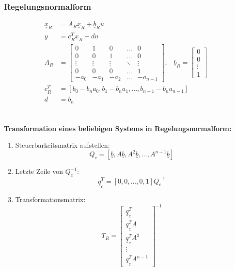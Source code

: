 \documentclass[a4paper,twocolumn,10pt]{article}
\begin{document}
\subsubsection{Regelungsnormalform}
\begin{equation*}
\begin{split}
\underline{\dot{x}}_R&=A_R\underline{x}_R+\underline{b}_Ru\\
y&=\underline{c}_R^T\underline{x}_R+du\\
A_R&=\begin{bmatrix}0 & 1 & 0 & ... & 0 \\ 0 & 0 & 1 & ... & 0 \\
\vdots & \vdots & \vdots & \ddots & \vdots \\ 0 & 0 & 0 & ... & 1 \\ -a_0 & -a_1 & -a_2 & ... & -a_{n-1}\end{bmatrix};\;\;\;\underline{b}_R=\begin{bmatrix}0 \\ 0 \\ \vdots \\ 1\end{bmatrix}\\
\underline{c}_R^T&=[b_0-b_na_0,b_1-b_na_1,...,b_{n-1}-b_na_{n-1}]\\
d&=b_n
\end{split}
\end{equation*}\\\\
\textbf{Transformation eines beliebigen Systems in Regelungsnormalform:}\\
\begin{enumerate}
\item Steuerbarkeitsmatrix aufstellen:
\begin{equation*}
Q_c=[\underline{b},A\underline{b},A^2\underline{b},...,A^{n-1}\underline{b}]
\end{equation*}
\item Letzte Zeile von $Q_c^{-1}$:
\begin{equation*}
\underline{q}_c^T=[0,0,...,0,1]Q_c^{-1}
\end{equation*}
\item Transformationsmatrix:
\begin{equation*}
T_R=\begin{bmatrix}\underline{q}_c^T \\ \underline{q}_c^TA \\ \underline{q}_c^TA^2 \\ \vdots \\ \underline{q}_c^TA^{n-1}\end{bmatrix}^{-1}
\end{equation*}
\end{enumerate}
\end{document}

